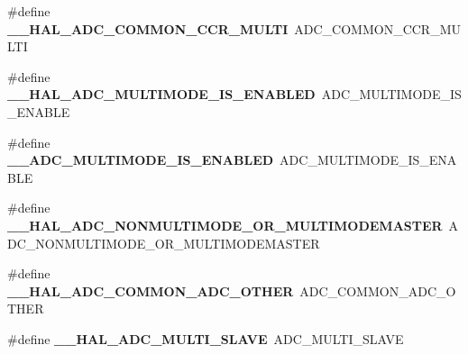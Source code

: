 \begin{DoxyCompactItemize}
\item 
\mbox{\label{group___h_a_l___a_d_c___aliased___macros_ga8bf50f7c58849d4cd141a421d55b148d}} 
\#define {\bfseries \+\_\+\+\_\+\+H\+A\+L\+\_\+\+A\+D\+C\+\_\+\+C\+O\+M\+M\+O\+N\+\_\+\+C\+C\+R\+\_\+\+M\+U\+L\+TI}~A\+D\+C\+\_\+\+C\+O\+M\+M\+O\+N\+\_\+\+C\+C\+R\+\_\+\+M\+U\+L\+TI
\item 
\mbox{\label{group___h_a_l___a_d_c___aliased___macros_ga79f75f2e379c482c38441c050efc7225}} 
\#define {\bfseries \+\_\+\+\_\+\+H\+A\+L\+\_\+\+A\+D\+C\+\_\+\+M\+U\+L\+T\+I\+M\+O\+D\+E\+\_\+\+I\+S\+\_\+\+E\+N\+A\+B\+L\+ED}~A\+D\+C\+\_\+\+M\+U\+L\+T\+I\+M\+O\+D\+E\+\_\+\+I\+S\+\_\+\+E\+N\+A\+B\+LE
\item 
\mbox{\label{group___h_a_l___a_d_c___aliased___macros_gaa5b9fcac48711d597023aecdb11afc51}} 
\#define {\bfseries \+\_\+\+\_\+\+A\+D\+C\+\_\+\+M\+U\+L\+T\+I\+M\+O\+D\+E\+\_\+\+I\+S\+\_\+\+E\+N\+A\+B\+L\+ED}~A\+D\+C\+\_\+\+M\+U\+L\+T\+I\+M\+O\+D\+E\+\_\+\+I\+S\+\_\+\+E\+N\+A\+B\+LE
\item 
\mbox{\label{group___h_a_l___a_d_c___aliased___macros_ga3dceabcf80e81b5a911bbe5ad3ff311a}} 
\#define {\bfseries \+\_\+\+\_\+\+H\+A\+L\+\_\+\+A\+D\+C\+\_\+\+N\+O\+N\+M\+U\+L\+T\+I\+M\+O\+D\+E\+\_\+\+O\+R\+\_\+\+M\+U\+L\+T\+I\+M\+O\+D\+E\+M\+A\+S\+T\+ER}~A\+D\+C\+\_\+\+N\+O\+N\+M\+U\+L\+T\+I\+M\+O\+D\+E\+\_\+\+O\+R\+\_\+\+M\+U\+L\+T\+I\+M\+O\+D\+E\+M\+A\+S\+T\+ER
\item 
\mbox{\label{group___h_a_l___a_d_c___aliased___macros_gafa9bcc01aa0b2a887721e8971031ad0b}} 
\#define {\bfseries \+\_\+\+\_\+\+H\+A\+L\+\_\+\+A\+D\+C\+\_\+\+C\+O\+M\+M\+O\+N\+\_\+\+A\+D\+C\+\_\+\+O\+T\+H\+ER}~A\+D\+C\+\_\+\+C\+O\+M\+M\+O\+N\+\_\+\+A\+D\+C\+\_\+\+O\+T\+H\+ER
\item 
\mbox{\label{group___h_a_l___a_d_c___aliased___macros_gaeff1a570027a91c87a339fd79704c3d2}} 
\#define {\bfseries \+\_\+\+\_\+\+H\+A\+L\+\_\+\+A\+D\+C\+\_\+\+M\+U\+L\+T\+I\+\_\+\+S\+L\+A\+VE}~A\+D\+C\+\_\+\+M\+U\+L\+T\+I\+\_\+\+S\+L\+A\+VE
\item 
\mbox{\label{group___h_a_l___a_d_c___aliased___macros_ga27072f37b7d50adad434a681331755f0}} 

\end{DoxyCompactItemize}
